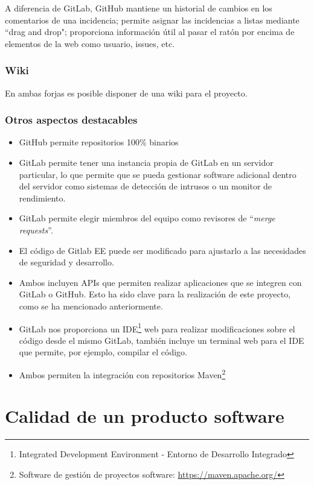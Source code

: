 
A diferencia de GitLab, GitHub mantiene un historial de cambios en los comentarios de una incidencia; permite asignar las incidencias a listas mediante ``drag and drop"; proporciona información útil al pasar el ratón por encima de elementos de la web como usuario, issues, etc.

\subsubsection{Wiki}
En ambas forjas es posible disponer de una wiki para el proyecto.

\subsubsection{Otros aspectos destacables}
\begin{itemize}
	\item GitHub permite repositorios 100\% binarios
	\item GitLab permite tener una instancia propia de GitLab en un servidor particular, lo que permite que se pueda gestionar software adicional dentro del servidor como sistemas de detección de intrusos o un monitor de rendimiento.
	\item GitLab permite elegir miembros del equipo como revisores de ``\textit{merge requests}''.
	\item El código de Gitlab EE puede ser modificado para ajustarlo a las necesidades de seguridad y desarrollo.
	\item Ambos incluyen APIs que permiten realizar aplicaciones que se integren con GitLab o GitHub. Esto ha sido clave para la realización de este proyecto, como se ha mencionado anteriormente.
	\item GitLab nos proporciona un  IDE\footnote{Integrated Development Environment - Entorno de Desarrollo Integrado } web para realizar modificaciones sobre el código desde el mismo GitLab, también incluye un terminal web para el IDE que permite, por ejemplo, compilar el código.
	\item Ambos permiten la integración con repositorios Maven\footnote{Software de gestión de proyectos software: \url{https://maven.apache.org/}}
\end{itemize}

\section{Calidad de un producto software}

